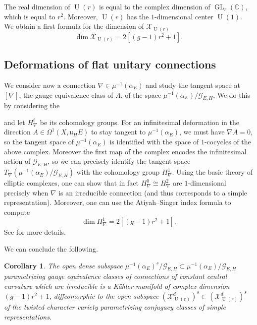 \documentclass[12pt,a4paper]{amsbook}
\newtheorem{corol}[thm]{Corollary}
\theoremstyle{remark} \newtheorem{rmk}[thm]{Remark}
\theoremstyle{definition} \newtheorem{defn}[thm]{Definition}
\theoremstyle{definition} \newtheorem{ex}[thm]{Example}
\theoremstyle{definition} \newtheorem{ej}{Exercise}
\let\emph\relax
\newcommand{\C}{\mathbb C}
\newcommand{\cG}{\mathcal G}
\newcommand{\cX}{\mathcal X}
\newcommand{\fu}{\mathfrak u}
\DeclareMathOperator{\GL}{GL}
\DeclareMathOperator{\U}{U}
\begin{document}
The real dimension of $\U(r)$ is equal to the complex dimension of $\GL_r(\C)$, which is equal to $r^2$. Moreover, $\U(r)$ has the $1$-dimensional center $\U(1)$. We obtain a first formula for the dimension of $\cX_{\U(r)}$
\begin{equation*}
\dim \cX_{\U(r)} = 2[(g-1)r^2 + 1].
\end{equation*}


\subsection*{Deformations of flat unitary connections}
We consider now a connection $\nabla \in \mu^{-1}(\alpha_E)$ and study the tangent space at $[\nabla]$, the gauge equivalence class of $A$, of the space $\mu^{-1}(\alpha_E)/\cG_{E,H}$. We do this by considering the \emph{gauge complex}
\begin{center}
\end{center}
and let $H^i_\nabla$ be its cohomology groups. For an infinitesimal deformation in the direction $A\in \Omega^1(X,\fu_H E)$ to stay tangent to $\mu^{-1}(\alpha_E)$, we must have $\nabla A = 0$, so the tangent space of $\mu^{-1}(\alpha_E)$ is identified  with the space of $1$-cocycles of the above complex. Moreover the first map of the complex encodes the infinitesimal action of $\cG_{E,H}$, so we can precisely identify the tangent space $T_\nabla (\mu^{-1}(\alpha_E)/\cG_{E,H})$ with the cohomology group $H^1_\nabla$.
Using the basic theory of elliptic complexes, one can show that in fact $H^0_\nabla \cong H^2_\nabla$ are $1$-dimensional precisely when $\nabla$ is an irreducible connection (and thus corresponds to a simple representation). Moreover, one can use the Atiyah--Singer index formula to compute
\begin{equation*}
\dim H^1_\nabla = 2[(g-1)r^2 + 1].
\end{equation*}
See \cite{AtiyahBott} for more details.

We can conclude the following.

\begin{corol}
The open dense subspace $\mu^{-1}(\alpha_E)^s/\cG_{E,H}\subset \mu^{-1}(\alpha_E)/\cG_{E,H}$ parametrizing gauge equivalence classes of connections of constant central curvature which are irreducible is a Kähler manifold of complex dimension $(g-1)r^2 +1$, diffeomorphic to the open subspace $(\cX^d_{\U(r)})^s\subset (\cX^d_{\U(r)})^s$ of the twisted character variety parametrizing conjugacy classes of simple representations.
\end{corol}
\end{document}
